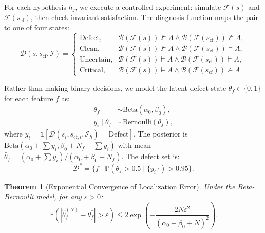 \documentclass[journal]{IEEEtran}
\theoremstyle{plain}
\newtheorem{theorem}{Theorem}[section]
\newcommand{\sys}{\mathcal{F}}
\newcommand{\beh}{\mathcal{B}}
\newcommand{\diag}{\mathcal{D}}
\newcommand{\ind}{\mathds{1}}
\newcommand{\Prob}{\mathbb{P}}
\begin{document}
For each hypothesis $h_j$, we execute a controlled experiment: simulate $\sys(s)$ and $\sys(s_{\text{cf}})$, then check invariant satisfaction. The diagnosis function maps the pair to one of four states:
\begin{equation}
\diag(s, s_{\text{cf}}, \mathcal{I}) = 
\begin{cases}
\text{Defect}, & \beh(\sys(s)) \not\models A \land \beh(\sys(s_{\text{cf}})) \not\models A, \\
\text{Clean}, & \beh(\sys(s)) \not\models A \land \beh(\sys(s_{\text{cf}})) \models A, \\
\text{Uncertain}, & \beh(\sys(s)) \models A \land \beh(\sys(s_{\text{cf}})) \models A, \\
\text{Critical}, & \beh(\sys(s)) \models A \land \beh(\sys(s_{\text{cf}})) \not\models A.
\end{cases}
\end{equation}

Rather than making binary decisions, we model the latent defect state $\theta_f \in \{0,1\}$ for each feature $f$ as:
\begin{align}
\theta_f &\sim \text{Beta}(\alpha_0, \beta_0), \\
y_i \mid \theta_f &\sim \text{Bernoulli}(\theta_f),
\end{align}
where $y_i = \ind[\diag(s_i, s_{\text{cf},i}, \mathcal{I}_h) = \text{Defect}]$. The posterior is $\text{Beta}(\alpha_0 + \sum y_i, \beta_0 + N_f - \sum y_i)$ with mean $\hat{\theta}_f = (\alpha_0 + \sum y_i)/(\alpha_0 + \beta_0 + N_f)$. The defect set is:
\begin{equation}
\mathcal{D}^* = \{f \mid \Prob(\theta_f > 0.5 \mid \{y_i\}) > 0.95\}.
\end{equation}

\begin{theorem}[Exponential Convergence of Localization Error]\label{thm:convergence}
Under the Beta-Bernoulli model, for any $\varepsilon > 0$:
\begin{equation}
\Prob(|\hat{\theta}_f^{(N)} - \theta_f^*| > \varepsilon) \leq 2\exp\left(-\frac{2N\varepsilon^2}{(\alpha_0+\beta_0+N)^2}\right).
\end{equation}
\end{theorem}
\end{document}

